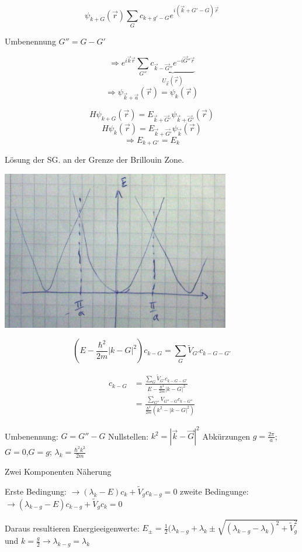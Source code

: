 \[\psi_{k+G}(\vec r) \sum_G c_{k+g'-G}e^{i(\vec k+G'-G)\vec r}\]

Umbenennung \(G''=G-G'\)

\[\Rightarrow e^{i\vec k\vec r}\sum_{G''} \underbrace{c_{\vec k-\vec G''}e^{-i\vec G''\vec r}}_{U_{\vec k}(\vec r)}\]
\[\Rightarrow \psi_{\vec k+\vec a}(\vec r) = \psi_k(\vec r)\]

\[H\psi_{k+G}(\vec r) = E_{\vec k+\vec G'}\psi_{\vec k+\vec G'}(\vec r)\]
\[H\psi_{k}(\vec r) = E_{\vec k+\vec G'}\psi_{\vec k}(\vec r)\]
\[\Rightarrow E_{k+G'}=E_k\]

Lösung der SG. an der Grenze der Brillouin Zone. 

\includegraphics[width=0.75\textwidth]{kap06_36.png}

\[(E-\frac{\hbar^2}{2m}|k-G|^2 )c_{k-G}=\sum_G \tilde V_{G'}c_{k-G-G'}\]

\begin{align}
c_{k-G} &= \frac{\sum_G \tilde V_{G'}c_{k-G-G'}}{E-\frac{\hbar^2}{2m}|k-G|^2}\\
&= \frac{\sum_{G''}V_{G''-G}c_{k-G''}}{\frac{\hbar^2}{2m}(k^2-|k-G|^2)}
\end{align}

Umbenennung: \(G=G''-G\)
Nullstellen: \(k^2=|\vec k-\vec G|^2\)
Abkürzungen \(g=\frac{2\pi}{a}\); \(G=0\),\(G=g\); \(\lambda_k = \frac{\hbar^2 k^2}{2m}\)


Zwei Komponenten Näherung 

Erste Bedingung: \(\rightarrow (\lambda_k -E)c_k+\tilde V_g c_{k-g} = 0\)
zweite Bedingunge: \(\rightarrow (\lambda_{k-g} -E)c_{k-g}+\tilde V_g c_k = 0\)

Daraus resultieren Energieeigenwerte: \(E_{\pm}=\frac{1}{2}(\lambda_{k-g}+\lambda_k\pm \sqrt{(\lambda_{k-g}-\lambda_k)^2+\tilde V_g^2}\) und \(k=\frac{g}{2}\rightarrow \lambda_{k-g}=\lambda_k\)


